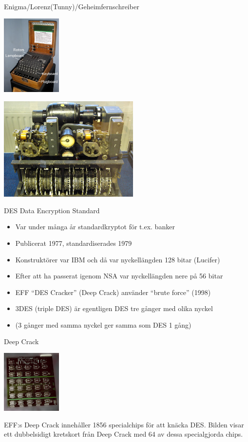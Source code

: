 \documentclass{beamer}
\begin{document}
\begin{frame}{Enigma/Lorenz(Tunny)/Geheimfernschreiber}
\parbox{3.5cm}{\sloppy \includegraphics[width=3cm]{images/EnigmaMachineLabeled}}
\parbox{7cm}{\sloppy \includegraphics[width=7cm]{images/Lorenz-SZ42-2}}
\end{frame}

\begin{frame}{DES Data Encryption Standard}
\begin{itemize}
\item Var under många år  standardkryptot för t.ex. banker
\pause \item Publicerat 1977, standardiserades 1979
\pause \item Konstruktörer var IBM och då var nyckellängden 128 bitar (Lucifer)
\pause \item Efter att ha passerat igenom NSA var nyckellängden nere på 56 bitar
\pause \item EFF ``DES Cracker'' (Deep Crack) använder  ``brute force'' (1998)
\pause \item 3DES (triple DES) är egentligen DES tre gånger med olika nyckel
\pause \item (3 gånger med samma nyckel ger samma som DES 1 gång)
\end{itemize}
\end{frame}

\begin{frame}{Deep Crack}
\parbox{3.5cm}{\sloppy \includegraphics[width=3cm]{images/Board300}}
\parbox{7cm}{
EFF:s Deep Crack innehåller 1856 specialchips för att knäcka DES. Bilden visar ett 
dubbelsidigt kretskort från Deep Crack med 64 av dessa specialgjorda chips.
}
\end{frame}
\end{document}
